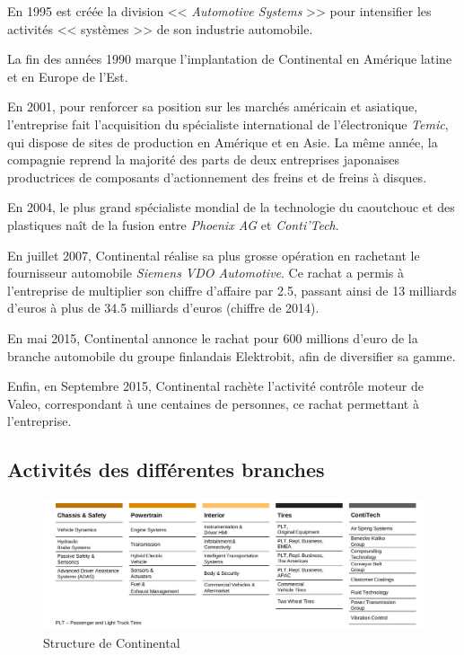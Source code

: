 En 1995 est créée la division << \textit{Automotive Systems} >> pour intensifier les activités << systèmes >> de son industrie automobile.

La fin des années 1990 marque l'implantation de Continental en Amérique latine et en Europe de l'Est.

En 2001, pour renforcer sa position sur les marchés américain et asiatique, l'entreprise fait l'acquisition du spécialiste international de l'électronique \textit{Temic}, qui dispose de sites de production en Amérique et en Asie. La même année, la compagnie reprend la majorité des parts de deux entreprises japonaises productrices de composants d'actionnement des freins et de freins à disques. 

En 2004, le plus grand spécialiste mondial de la technologie du caoutchouc et des plastiques naît de la fusion entre \textit{Phoenix AG} et \textit{Conti'Tech}.

En juillet 2007, Continental réalise sa plus grosse opération en rachetant le fournisseur automobile \textit{Siemens VDO Automotive}. Ce rachat a permis à l'entreprise de multiplier son chiffre d'affaire par 2.5, passant ainsi de 13 milliards d'euros à plus de 34.5 milliards d'euros (chiffre de 2014).

En mai 2015, Continental annonce le rachat pour 600 millions d'euro de la branche automobile du groupe finlandais Elektrobit, afin de diversifier sa gamme.

Enfin, en Septembre 2015, Continental rachète l'activité contrôle moteur de Valeo, correspondant à une centaines de personnes, ce rachat permettant à l'entreprise.
		
		\subsection{Activités des différentes branches}
		\begin{figure}[H]
			\hspace{-55px}
			\includegraphics[width=21cm]{contents/images/structureConti.jpg}
			\caption{Structure de Continental}
			\label{fig:structConti}
		\end{figure}

